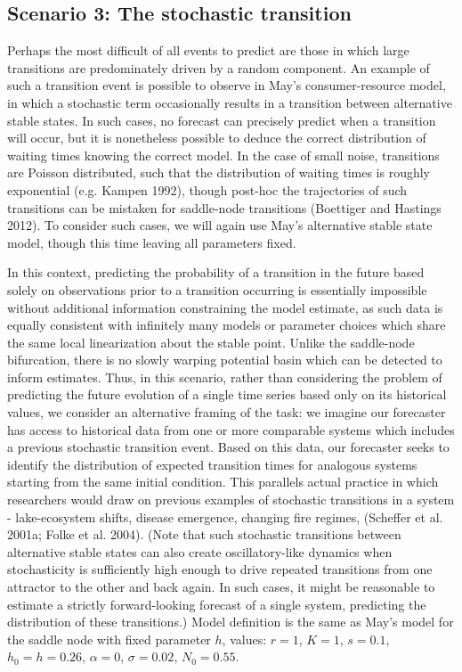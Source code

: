 \documentclass{article}
\begin{document}
\hypertarget{scenario-3-the-stochastic-transition}{%
\subsection{Scenario 3: The stochastic
transition}\label{scenario-3-the-stochastic-transition}}

Perhaps the most difficult of all events to predict are those in which
large transitions are predominately driven by a random component. An
example of such a transition event is possible to observe in May's
consumer-resource model, in which a stochastic term occasionally results
in a transition between alternative stable states. In such cases, no
forecast can precisely predict when a transition will occur, but it is
nonetheless possible to deduce the correct distribution of waiting times
knowing the correct model. In the case of small noise, transitions are
Poisson distributed, such that the distribution of waiting times is
roughly exponential (e.g. Kampen 1992), though post-hoc the trajectories
of such transitions can be mistaken for saddle-node transitions
(Boettiger and Hastings 2012). To consider such cases, we will again use
May's alternative stable state model, though this time leaving all
parameters fixed.

In this context, predicting the probability of a transition in the
future based solely on observations prior to a transition occurring is
essentially impossible without additional information constraining the
model estimate, as such data is equally consistent with infinitely many
models or parameter choices which share the same local linearization
about the stable point. Unlike the saddle-node bifurcation, there is no
slowly warping potential basin which can be detected to inform
estimates. Thus, in this scenario, rather than considering the problem
of predicting the future evolution of a single time series based only on
its historical values, we consider an alternative framing of the task:
we imagine our forecaster has access to historical data from one or more
comparable systems which includes a previous stochastic transition
event. Based on this data, our forecaster seeks to identify the
distribution of expected transition times for analogous systems starting
from the same initial condition. This parallels actual practice in which
researchers would draw on previous examples of stochastic transitions in
a system - lake-ecosystem shifts, disease emergence, changing fire
regimes, (Scheffer et al. 2001a; Folke et al. 2004). (Note that such
stochastic transitions between alternative stable states can also create
oscillatory-like dynamics when stochasticity is sufficiently high enough
to drive repeated transitions from one attractor to the other and back
again. In such cases, it might be reasonable to estimate a strictly
forward-looking forecast of a single system, predicting the distribution
of these transitions.) Model definition is the same as May's model for
the saddle node with fixed parameter \(h\), values: \(r = 1\),
\(K = 1\), \(s = 0.1\), \(h_0 = h = 0.26\), \(\alpha = 0\),
\(\sigma = 0.02\), \(N_0 = 0.55\).
\end{document}
